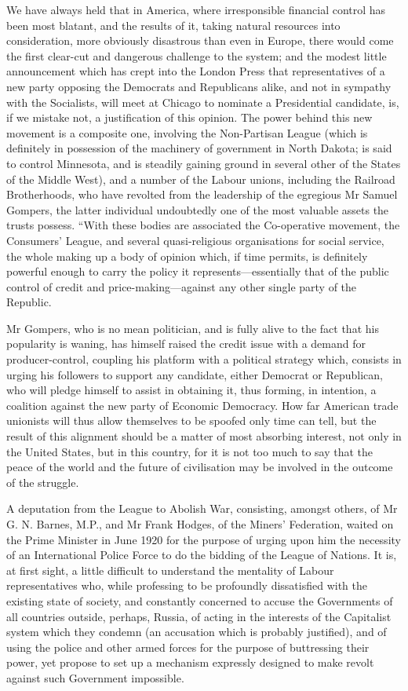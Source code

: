 \documentclass{book}
\begin{document}
We have always held that in America, where irresponsible financial control has been most blatant, and the results of it, taking natural resources into consideration, more obviously disastrous than even in Europe, there would come the first clear-cut and dangerous challenge to the system; and the modest little announcement which has crept into the London Press that representatives of a new party opposing the Democrats and Republicans alike, and not in sympathy with the Socialists, will meet at Chicago to nominate a Presidential candidate, is, if we mistake not, a justification of this opinion. The power behind this new movement is a composite one, involving the Non-Partisan League (which is definitely in possession of the machinery of government in North Dakota; is said to control Minnesota, and is steadily gaining ground in several other of the States of the Middle West), and a number of the Labour unions, including the Railroad Brotherhoods, who have revolted from the leadership of the egregious Mr Samuel Gompers, the latter individual undoubtedly one of the most valuable assets the trusts possess. “With these bodies are associated the Co-operative movement, the Consumers’ League, and several quasi-religious organisations for social service, the whole making up a body of opinion which, if time permits, is definitely powerful enough to carry the policy it represents—essentially that of the public control of credit and price-making—against any other single party of the Republic.

Mr Gompers, who is no mean politician, and is fully alive to the fact that his popularity is waning, has himself raised the credit issue with a demand for producer-control, coupling his platform with a political strategy which, consists in urging his followers to support any candidate, either Democrat or Republican, who will pledge himself to assist in obtaining it, thus forming, in intention, a coalition against the new party of Economic Democracy. How far American trade unionists will thus allow themselves to be spoofed only time can tell, but the result of this alignment should be a matter of most absorbing interest, not only in the United States, but in this country, for it is not too much to say that the peace of the world and the future of civilisation may be involved in the outcome of the struggle.

A deputation from the League to Abolish War, consisting, amongst others, of Mr G. N. Barnes, M.P., and Mr Frank Hodges, of the Miners’ Federation, waited on the Prime Minister in June 1920 for the purpose of urging upon him the necessity of an International Police Force to do the bidding of the League of Nations. It is, at first sight, a little difficult to understand the mentality of Labour representatives who, while professing to be profoundly dissatisfied with the existing state of society, and constantly concerned to accuse the Governments of all countries outside, perhaps, Russia, of acting in the interests of the Capitalist system which they condemn (an accusation which is probably justified), and of using the police and other armed forces for the purpose of buttressing their power, yet propose to set up a mechanism expressly designed to make revolt against such Government impossible.
\end{document}
